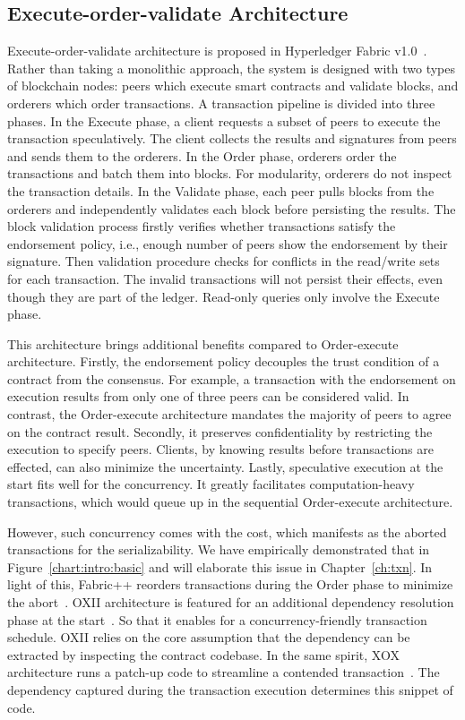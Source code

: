 \subsection{Execute-order-validate Architecture}
\label{sec:literature:execution:execute-order-validate}
Execute-order-validate architecture is proposed in Hyperledger Fabric v1.0~\cite{androulaki2018hyperledger}. 
Rather than taking a monolithic approach, the system is designed with two types of blockchain nodes: peers which execute smart contracts and validate blocks, and orderers which order transactions. 
A transaction pipeline is divided into three phases. 
In the Execute phase, a client requests a subset of peers to execute the transaction speculatively. 
The client collects the results and signatures from peers and sends them to the orderers. 
In the Order phase, orderers order the transactions and batch them into blocks.
For modularity, orderers do not inspect the transaction details. 
In the Validate phase, each peer pulls blocks from the orderers and independently validates each block before persisting the results. 
The block validation process firstly verifies whether transactions satisfy the endorsement policy, i.e., enough number of peers show the endorsement by their signature. 
Then validation procedure checks for conflicts in the read/write sets for each transaction. 
The invalid transactions will not persist their effects, even though they are part of the ledger. 
Read-only queries only involve the Execute phase. 

This architecture brings additional benefits compared to Order-execute architecture. 
Firstly, the endorsement policy decouples the trust condition of a contract from the consensus. 
For example, a transaction with the endorsement on execution results from only one of three peers can be considered valid. 
In contrast, the Order-execute architecture mandates the majority of peers to agree on the contract result. 
Secondly, it preserves confidentiality by restricting the execution to specify peers.
Clients, by knowing results before transactions are effected, can also minimize the uncertainty. 
Lastly, speculative execution at the start fits well for the concurrency.
It greatly facilitates computation-heavy transactions, which would queue up in the sequential Order-execute architecture. 

However, such concurrency comes with the cost, which manifests as the aborted transactions for the serializability. 
We have empirically demonstrated that in Figure~\ref{chart:intro:basic} and will elaborate this issue in Chapter~\ref{ch:txn}. 
In light of this, Fabric++ reorders transactions during the Order phase to minimize the abort~\cite{sharma2019blurring}. 
OXII architecture is featured for an additional dependency resolution phase at the start~\cite{amiri2019parblockchain}.
So that it enables for a concurrency-friendly transaction schedule. 
OXII relies on the core assumption that the dependency can be extracted by inspecting the contract codebase. 
In the same spirit, XOX architecture runs a patch-up code to streamline a contended transaction~\cite{gorenflo2020xox}. 
The dependency captured during the transaction execution determines this snippet of code. 

